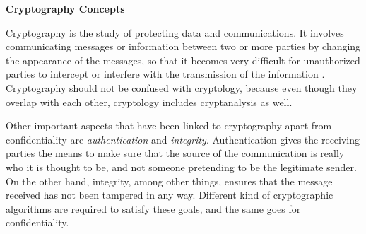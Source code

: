\textbf{Cryptography Concepts}

Cryptography is the study of protecting data and communications. It involves communicating messages or information between two or more parties by changing the appearance of the messages, so that it becomes very difficult for unauthorized parties to intercept or interfere with the transmission of the information \cite{IntroCryptoMath}. Cryptography should not be confused with cryptology, because even though they overlap with each other, cryptology includes cryptanalysis as well. 

Other important aspects that have been linked to cryptography apart from confidentiality are \textit{authentication} and \textit{integrity}. Authentication gives the receiving parties the means to make sure that the source of the communication is really who it is thought to be, and not someone pretending to be the legitimate sender. On the other hand, integrity, among other things, ensures that the message received has not been tampered in any way. Different kind of cryptographic algorithms are required to satisfy these goals, and the same goes for confidentiality.

